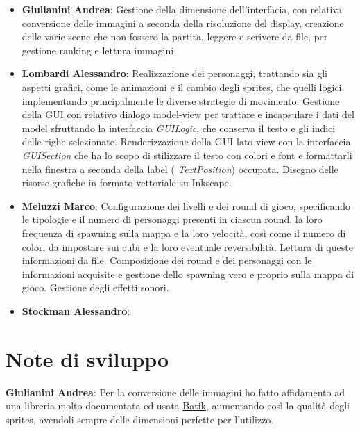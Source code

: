 \documentclass[a4paper,12pt, hidelinks]{report}
\begin{document}
\begin{itemize}
	\item \textbf{Giulianini Andrea}: Gestione della dimensione dell'interfacia, con relativa conversione delle immagini a seconda della risoluzione del display, creazione delle varie scene che non fossero la partita, leggere e scrivere da file, per gestione ranking e lettura immagini

	\item \textbf{Lombardi Alessandro}: Realizzazione dei personaggi, trattando sia gli aspetti grafici, come le animazioni e il cambio degli sprites, che quelli logici implementando principalmente le diverse strategie di movimento. Gestione della GUI con relativo dialogo model-view per trattare e incapsulare i dati del model sfruttando la interfaccia \emph{GUILogic}, che conserva il testo e gli indici delle righe selezionate. Renderizzazione della GUI lato view con la interfaccia \emph{GUISection} che ha lo scopo di stilizzare il testo con colori e font e formattarli nella finestra a seconda della label ( \emph{TextPosition}) occupata. Disegno delle risorse grafiche in formato vettoriale su Inkscape.

	\item \textbf{Meluzzi Marco}: Configurazione dei livelli e dei round di gioco, specificando le tipologie e il numero di personaggi presenti in ciascun round, la loro frequenza di spawning sulla mappa e la loro velocità, così come il numero di colori da impostare sui cubi e la loro eventuale reversibilità. Lettura di queste informazioni da file. Composizione dei round e dei personaggi con le informazioni acquisite e gestione dello spawning vero e proprio sulla mappa di gioco. Gestione degli effetti sonori.

	\item \textbf{Stockman Alessandro}:

\end{itemize}

\section{Note di sviluppo}

	\item \textbf{Giulianini Andrea}: Per la conversione delle immagini ho fatto affidamento ad una libreria molto documentata ed usata \href{https://xmlgraphics.apache.org/batik/using/swing.html}{Batik}, aumentando così la qualità degli sprites, avendoli sempre delle dimensioni perfette per l'utilizzo.
\end{document}
